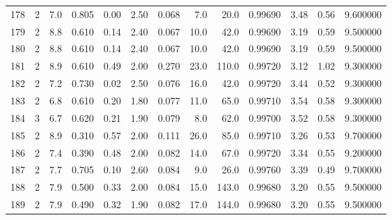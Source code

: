 \begin{tabular}{lrrrrrrrrrrrr}
178  &        2 &            7.0 &             0.805 &         0.00 &            2.50 &      0.068 &                  7.0 &                  20.0 &  0.99690 &  3.48 &       0.56 &   9.600000 \\
179  &        2 &            8.8 &             0.610 &         0.14 &            2.40 &      0.067 &                 10.0 &                  42.0 &  0.99690 &  3.19 &       0.59 &   9.500000 \\
180  &        2 &            8.8 &             0.610 &         0.14 &            2.40 &      0.067 &                 10.0 &                  42.0 &  0.99690 &  3.19 &       0.59 &   9.500000 \\
181  &        2 &            8.9 &             0.610 &         0.49 &            2.00 &      0.270 &                 23.0 &                 110.0 &  0.99720 &  3.12 &       1.02 &   9.300000 \\
182  &        2 &            7.2 &             0.730 &         0.02 &            2.50 &      0.076 &                 16.0 &                  42.0 &  0.99720 &  3.44 &       0.52 &   9.300000 \\
183  &        2 &            6.8 &             0.610 &         0.20 &            1.80 &      0.077 &                 11.0 &                  65.0 &  0.99710 &  3.54 &       0.58 &   9.300000 \\
184  &        3 &            6.7 &             0.620 &         0.21 &            1.90 &      0.079 &                  8.0 &                  62.0 &  0.99700 &  3.52 &       0.58 &   9.300000 \\
185  &        2 &            8.9 &             0.310 &         0.57 &            2.00 &      0.111 &                 26.0 &                  85.0 &  0.99710 &  3.26 &       0.53 &   9.700000 \\
186  &        2 &            7.4 &             0.390 &         0.48 &            2.00 &      0.082 &                 14.0 &                  67.0 &  0.99720 &  3.34 &       0.55 &   9.200000 \\
187  &        2 &            7.7 &             0.705 &         0.10 &            2.60 &      0.084 &                  9.0 &                  26.0 &  0.99760 &  3.39 &       0.49 &   9.700000 \\
188  &        2 &            7.9 &             0.500 &         0.33 &            2.00 &      0.084 &                 15.0 &                 143.0 &  0.99680 &  3.20 &       0.55 &   9.500000 \\
189  &        2 &            7.9 &             0.490 &         0.32 &            1.90 &      0.082 &                 17.0 &                 144.0 &  0.99680 &  3.20 &       0.55 &   9.500000 \\

\end{tabular}
